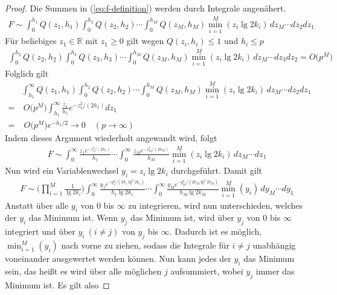 \documentclass[a4paper, 11pt, ngerman]{article}
\newcommand{\R}{\mathbb{R}}
\theoremstyle{definition}
\theoremstyle{plain}
\theoremstyle{remark}
\begin{document}
\begin{proof}
    Die Summen in (\ref{eq:f-definition}) werden durch Integrale angenähert.
    \begin{align*}
        F \sim
        \int_0^{h_1} Q(z_1, h_1)
        \int_0^{h_2} Q(z_2, h_2) \cdots
        \int_0^{h_M} Q(z_M, h_M)
        \min_{i = 1}^M(z_i \lg 2k_i) \, dz_M \cdots dz_2 dz_1
    \end{align*}
    Für beliebiges $z_1 \in \R$ mit $z_1 \ge 0$ gilt wegen $Q(z_i, h_i) \le 1$ und $h_i \le p$
    \begin{align*}
        \int_0^{h_2} Q(z_2, h_2)
        \int_0^{h_3} Q(z_3, h_3) \cdots
        \int_0^{h_M} Q(z_M, h_M)
        \min_{i = 1}^M(z_i \lg 2k_i) \, dz_M \cdots dz_3 dz_2 = O \big (p^M \big )
    \end{align*}
    Folglich gilt
    \begin{align*}
          & \int_{h_1}^{\infty} Q(z_1, h_1)
        \int_0^{h_2} Q(z_2, h_2) \cdots
        \int_0^{h_M} Q(z_M, h_M)
        \min_{i = 1}^M(z_i \lg 2k_i) \, dz_M \cdots dz_2 dz_1           \\
        = & \ O \big (p^M \big ) \int_{h_1}^{\infty}
        \frac {z_1} {h_1} e^{-z_1^2/(2h_1)} dz_1                        \\
        = & \; O \big (p^M \big ) e^{-h_1/2} \to 0 \quad (p \to \infty)
    \end{align*}
    Indem dieses Argument wiederholt angewandt wird, folgt
    \begin{align*}
        F \sim
        \int_0^{\infty}
        \frac {z_1 e^{-z_1^2/(2h_1)}} {h_1}  \cdots
        \int_0^{\infty}
        \frac {z_M e^{-z_M^2/(2h_M)}} {h_M}
        \min_{i = 1}^M(z_i \lg 2k_i) \, dz_M \cdots dz_1
    \end{align*}
    Nun wird ein Variablenwechsel $y_i = z_i \lg 2k_i$ durchgeführt. Damit gilt
    \begin{align*}
        F \sim
        \Bigg (\prod_{i = 1}^M \frac 1 {\lg 2k_i} \Bigg )
        \int_0^{\infty}
        \frac {y_1 e^{-y_1^2 / (2h_1 \lg^2 2k_1)}} {h_1\lg 2k_1}  \cdots
        \int_0^{\infty}
        \frac {y_M e^{-y_M^2 / (2h_M \lg^2 2k_M)}} {h_M \lg 2k_M}
        \min_{i = 1}^M(y_i) \, dy_M \cdots dy_1
    \end{align*}
    Anstatt über alle $y_i$ von $0$ bis $\infty$ zu integrieren, wird nun unterschieden, welches der $y_i$ das Minimum ist. Wenn $y_j$ das Minimum ist, wird über $y_j$ von $0$ bis $\infty$ integriert und über $y_i \ (i \ne j)$ von $y_j$ bis $\infty$. Dadurch ist es möglich, $\min_{i = 1}^M (y_i)$ nach vorne zu ziehen, sodass die Integrale für $i \ne j$ unabhängig voneinander ausgewertet werden können. Nun kann jedes der $y_i$ das Minimum sein, das heißt es wird über alle möglichen $j$ aufsummiert, wobei $y_j$ immer das Minimum ist. Es gilt also

\end{proof}
\end{document}
